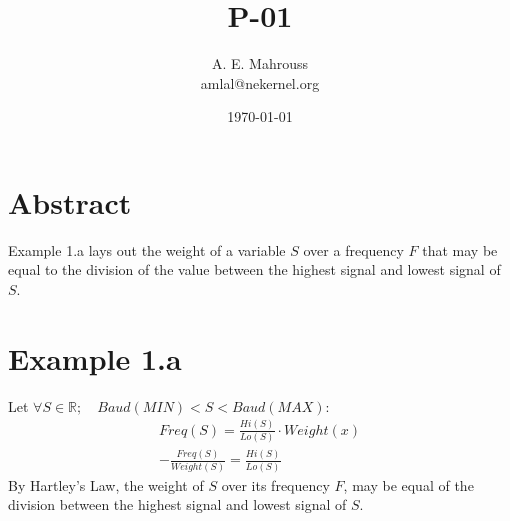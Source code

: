 \documentclass{article}
\title{P-01}
\author{A. E. Mahrouss\\amlal@nekernel.org}
\date{\today}
\begin{document}
\maketitle

\section{Abstract}
Example 1.a lays out the weight of a variable $S$ over a frequency $F$ that may be equal to the division of the value between the highest signal and lowest signal of $S$.

\section{Example 1.a}
Let
$\forall S \in \mathbb{R}; \quad Baud(MIN) < S < Baud(MAX)$:
\begin{align*}
Freq(S) = \frac{Hi(S)}{Lo(S)} \cdot Weight(x)\\
-\frac{Freq(S)}{Weight(S)} = \frac{Hi(S)}{Lo(S)}
\end{align*}
By Hartley's Law, the weight of $S$ over its frequency $F$, may be equal of the division between the highest signal and lowest signal of $S$.

\nocite{*}



\end{document}
